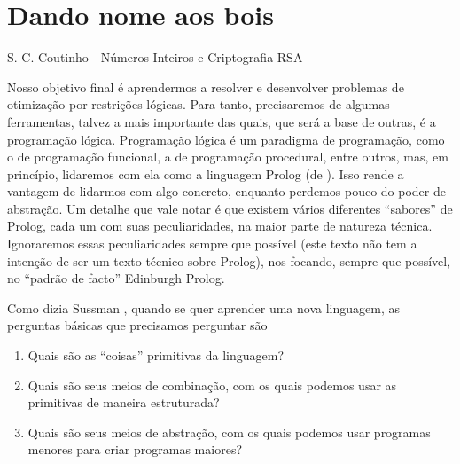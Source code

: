 
\setcounter{section}{-1} %


%

\section{Dando nome aos bois}

\epigraph{}{S. C. Coutinho -
Números Inteiros e Criptografia RSA}


Nosso objetivo final é aprendermos a resolver e desenvolver problemas
de otimização por restrições lógicas. Para tanto, precisaremos de
algumas ferramentas, talvez a mais importante das quais, que será a
base de outras, é a programação lógica. Programação lógica é um
paradigma de programação, como o de programação funcional, a de
programação procedural, entre outros, mas, em princípio, lidaremos com
ela como a linguagem Prolog (de ). Isso rende a vantagem de lidarmos com algo concreto,
enquanto perdemos pouco do poder de abstração. Um detalhe que vale
notar é que existem vários diferentes ``sabores'' de Prolog, cada um
com suas peculiaridades, na maior parte de natureza
técnica. Ignoraremos essas peculiaridades sempre que possível (este
texto não tem a intenção de ser um texto técnico sobre Prolog), nos
focando, sempre que possível, no ``padrão de facto'' Edinburgh Prolog.

Como dizia Sussman \cite{sussman} , quando se quer aprender uma nova
linguagem, as perguntas básicas que precisamos perguntar são

\begin{enumerate}
  \item Quais são as ``coisas'' primitivas da linguagem?
  \item Quais são seus meios de combinação, com os quais podemos usar
as primitivas de maneira estruturada?
  \item Quais são seus meios de abstração, com os quais podemos usar
programas menores para criar programas maiores?
\end{enumerate}

